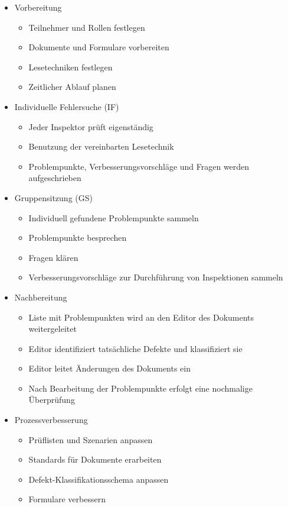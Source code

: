 \documentclass{article}
\begin{document}
\begin{itemize}
\begin{itemize}
    \item Vorbereitung
    \begin{itemize}
      \item Teilnehmer und Rollen festlegen
      \item Dokumente und Formulare vorbereiten
      \item Lesetechniken festlegen
      \item Zeitlicher Ablauf planen
    \end{itemize}
    \item Individuelle Fehlersuche (IF)
    \begin{itemize}
      \item Jeder Inspektor prüft eigenständig
      \item Benutzung der vereinbarten Lesetechnik
      \item Problempunkte, Verbesserungsvorschläge und Fragen werden aufgeschrieben
    \end{itemize}
    \item Gruppensitzung (GS)
    \begin{itemize}
      \item Individuell gefundene Problempunkte sammeln
      \item Problempunkte besprechen
      \item Fragen klären
      \item Verbesserungsvorschläge zur Durchführung von Inspektionen sammeln
    \end{itemize}
    \item Nachbereitung
    \begin{itemize}
      \item Liste mit Problempunkten wird an den Editor des Dokuments weitergeleitet
      \item Editor identifiziert tatsächliche Defekte und klassifiziert sie
      \item Editor leitet Änderungen des Dokuments ein
      \item Nach Bearbeitung der Problempunkte erfolgt eine nochmalige Überprüfung
    \end{itemize}
    \item Prozessverbesserung
    \begin{itemize}
      \item Prüflisten und Szenarien anpassen
      \item Standards für Dokumente erarbeiten
      \item Defekt-Klassifikationsschema anpassen
      \item Formulare verbessern

\end{itemize}
\end{itemize}
\end{itemize}
\end{document}
